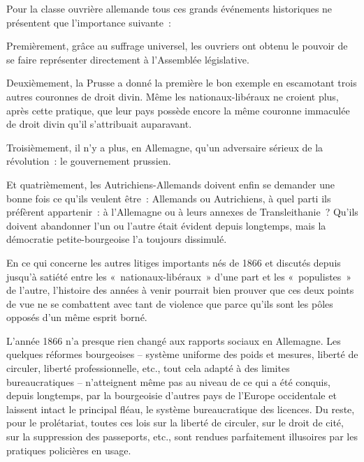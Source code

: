 \documentclass[french,twoside]{book} %
\begin{document}
Pour la classe ouvrière allemande tous ces grands événements historiques ne présentent que l’importance suivante :\par
Premièrement, grâce au suffrage universel, les ouvriers ont obtenu le pouvoir de se faire représenter directement à l’Assemblée législative.\par
Deuxièmement, la Prusse a donné la première le bon exemple en escamotant trois autres couronnes de droit divin. Même les nationaux-libéraux ne croient plus, après cette pratique, que leur pays possède encore la même couronne immaculée de droit divin qu’il s’attribuait auparavant.\par
Troisièmement, il n’y a plus, en Allemagne, qu’un adversaire sérieux de la révolution : le gouvernement prussien.\par
Et quatrièmement, les Autrichiens-Allemands doivent enfin se demander une bonne fois ce qu’ils veulent être : Allemands ou Autrichiens, à quel parti ils préfèrent appartenir : à l’Allemagne ou à leurs annexes de Transleithanie ? Qu’ils doivent abandonner l’un ou l’autre était évident depuis longtemps, mais la démocratie petite-bourgeoise l’a toujours dissimulé.\par
En ce qui concerne les autres litiges importants nés de 1866 et discutés depuis jusqu’à satiété entre les « nationaux-libéraux » d’une part et les « populistes » de l’autre, l’histoire des années à venir pourrait bien prouver que ces deux points de vue ne se combattent avec tant de violence que parce qu’ils sont les pôles opposés d’un même esprit borné.\par
L’année 1866 n’a presque rien changé aux rapports sociaux en Allemagne. Les quelques réformes bourgeoises – système uniforme des poids et mesures, liberté de circuler, liberté professionnelle, etc., tout cela adapté à des limites bureaucratiques – n’atteignent même pas au niveau de ce qui a été conquis, depuis longtemps, par la bourgeoisie d’autres pays de l’Europe occidentale et laissent intact le principal fléau, le système bureaucratique des licences. Du reste, pour le prolétariat, toutes ces lois sur la liberté de circuler, sur le droit de cité, sur la suppression des passeports, etc., sont rendues parfaitement illusoires par les pratiques policières en usage.\par
\end{document}
